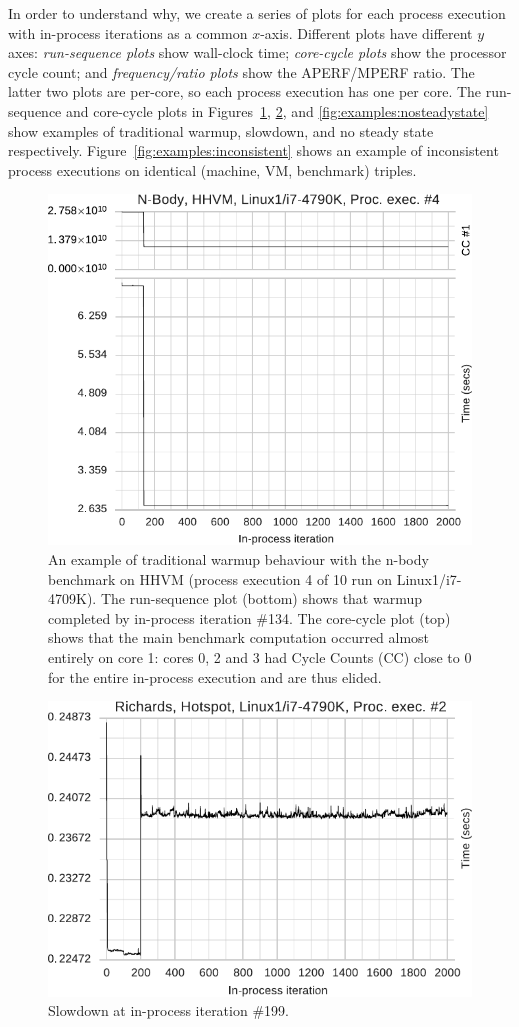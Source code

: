 \documentclass[preprint,numbers,10pt]{sigplanconf}
\newcommand{\bencherthree}{Linux1/i7-4709K\xspace}
\begin{document}
In order to understand why, we create a series of plots for each process execution
with in-process iterations as a common $x$-axis. Different plots have different $y$
axes: \emph{run-sequence plots} show wall-clock time; \emph{core-cycle plots}
show the processor cycle count; and \emph{frequency/ratio plots} show the
APERF/MPERF ratio. The latter two plots are per-core, so each process execution
has one per core. The run-sequence and core-cycle plots in Figures~\ref{fig:examples:trad}, \ref{fig:examples:slowdown1},
and \ref{fig:examples:nosteadystate} show examples of traditional warmup, slowdown,
and no steady state respectively. Figure~\ref{fig:examples:inconsistent} shows
an example of inconsistent process executions on identical (machine, VM,
benchmark) triples.

\begin{figure}[t]
\centering
\includegraphics[width=.45\textwidth]{examples/new_warmup_no_migrate.pdf}
\caption{An example of traditional warmup behaviour with the n-body benchmark on
HHVM (process execution 4 of 10 run on \bencherthree). The run-sequence plot
(bottom) shows that warmup completed by in-process iteration \#134. The
core-cycle plot (top) shows that the main benchmark computation
occurred almost entirely on core 1: cores 0, 2 and 3 had Cycle Counts (CC) close
to 0 for the entire in-process execution and are thus elided.}
\label{fig:examples:trad}
\end{figure}

\begin{figure}[t]
\centering
\includegraphics[width=.45\textwidth]{examples/new_slowdown.pdf}
\caption{Slowdown at in-process iteration \#199.}
\label{fig:examples:slowdown1}
\end{figure}
\end{document}
